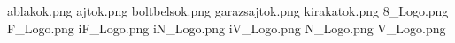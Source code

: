 ablakok.png
ajtok.png
boltbelsok.png
garazsajtok.png
kirakatok.png
8_Logo.png
F_Logo.png
iF_Logo.png
iN_Logo.png
iV_Logo.png
N_Logo.png
V_Logo.png
